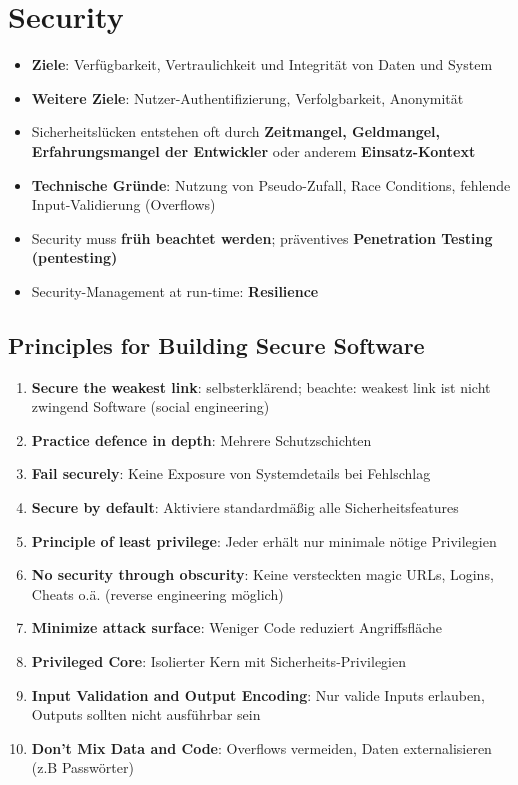 \section{Security}
\label{sc:sec:security}

\begin{itemize}
	\item \textbf{Ziele}: Verfügbarkeit, Vertraulichkeit und Integrität von Daten und System
	\item \textbf{Weitere Ziele}: Nutzer-Authentifizierung, Verfolgbarkeit, Anonymität
	\item Sicherheitslücken entstehen oft durch \textbf{Zeitmangel, Geldmangel, Erfahrungsmangel der Entwickler} oder anderem \textbf{Einsatz-Kontext}
	\item \textbf{Technische Gründe}: Nutzung von Pseudo-Zufall, Race Conditions, fehlende Input-Validierung (Overflows)
	\item Security muss \textbf{früh beachtet werden}; präventives \textbf{Penetration Testing (pentesting)}
	\item Security-Management at run-time: \textbf{Resilience}
\end{itemize}

\subsection{Principles for Building Secure Software}
\label{sc:sub:principles_for_building_secure_software}

\begin{enumerate}
	\item \textbf{Secure the weakest link}: selbsterklärend; beachte: weakest link ist nicht zwingend Software (social engineering)
	\item \textbf{Practice defence in depth}: Mehrere Schutzschichten
	\item \textbf{Fail securely}: Keine Exposure von Systemdetails bei Fehlschlag
	\item \textbf{Secure by default}: Aktiviere standardmäßig alle Sicherheitsfeatures
	\item \textbf{Principle of least privilege}: Jeder erhält nur minimale nötige Privilegien
	\item \textbf{No security through obscurity}: Keine versteckten magic URLs, Logins, Cheats o.ä. (reverse engineering möglich)
	\item \textbf{Minimize attack surface}: Weniger Code reduziert Angriffsfläche
	\item \textbf{Privileged Core}: Isolierter Kern mit Sicherheits-Privilegien
	\item \textbf{Input Validation and Output Encoding}: Nur valide Inputs erlauben, Outputs sollten nicht ausführbar sein
	\item \textbf{Don't Mix Data and Code}: Overflows vermeiden, Daten externalisieren (z.B Passwörter)
\end{enumerate}

